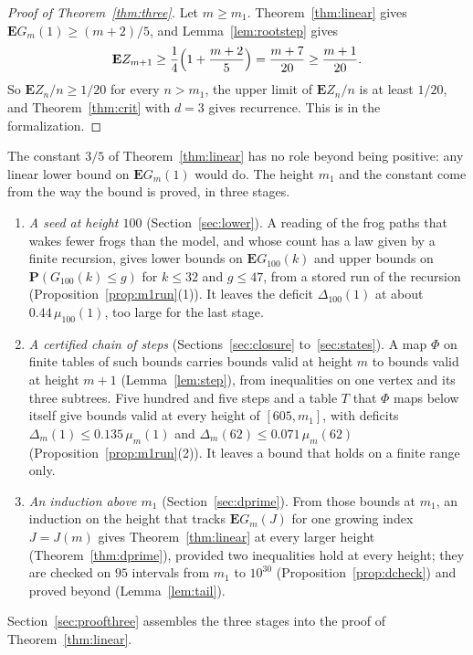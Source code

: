 \documentclass[11pt]{amsart}
\theoremstyle{definition}
\numberwithin{equation}{section}
\newcommand{\computed}[1]{\ignorespaces}
\newcommand{\E}{\mathbf{E}}
\renewcommand{\P}{\mathbf{P}}
\begin{document}
\begin{proof}[Proof of Theorem~\ref{thm:three}]
Let $m\ge m_1$. Theorem~\ref{thm:linear} gives $\E G_m(1)\ge(m+2)/5$, and Lemma~\ref{lem:rootstep} gives
\[
\E Z_{m+1}\ge\frac14\Bigl(1+\frac{m+2}5\Bigr)=\frac{m+7}{20}\ge\frac{m+1}{20}.
\]
So $\E Z_n/n\ge1/20$ for every $n>m_1$, the upper limit of $\E Z_n/n$ is at least $1/20$, and Theorem~\ref{thm:crit} with $d=3$ gives recurrence. This is  in the formalization.\computed{code/formal-proof/main_axioms.lean, .github/workflows/ci.yml}
\end{proof}

The constant $3/5$ of Theorem~\ref{thm:linear} has no role beyond being positive: any linear lower bound on $\E G_m(1)$ would do. The height $m_1$ and the constant come from the way the bound is proved, in three stages.
\begin{enumerate}
\item \emph{A seed at height $100$} (Section~\ref{sec:lower}). A reading of the frog paths that wakes fewer frogs than the model, and whose count has a law given by a finite recursion, gives lower bounds on $\E G_{100}(k)$ and upper bounds on $\P(G_{100}(k)\le g)$ for $k\le32$ and $g\le47$, from a stored run of the recursion (Proposition~\ref{prop:m1run}(1)). It leaves the deficit $\Delta_{100}(1)$ at about $0.44\,\mu_{100}(1)$, too large for the last stage.
\item \emph{A certified chain of steps} (Sections~\ref{sec:closure} to~\ref{sec:states}). A map $\Phi$ on finite tables of such bounds carries bounds valid at height $m$ to bounds valid at height $m+1$ (Lemma~\ref{lem:step}), from inequalities on one vertex and its three subtrees. Five hundred and five steps and a table $T$ that $\Phi$ maps below itself give bounds valid at every height of $[605,m_1]$, with deficits $\Delta_m(1)\le0.135\,\mu_m(1)$ and $\Delta_m(62)\le0.071\,\mu_m(62)$ (Proposition~\ref{prop:m1run}(2)). It leaves a bound that holds on a finite range only.
\item \emph{An induction above $m_1$} (Section~\ref{sec:dprime}). From those bounds at $m_1$, an induction on the height that tracks $\E G_m(J)$ for one growing index $J=J(m)$ gives Theorem~\ref{thm:linear} at every larger height (Theorem~\ref{thm:dprime}), provided two inequalities hold at every height; they are checked on $95$ intervals from $m_1$ to $10^{30}$ (Proposition~\ref{prop:dcheck}) and proved beyond (Lemma~\ref{lem:tail}).
\end{enumerate}
Section~\ref{sec:proofthree} assembles the three stages into the proof of Theorem~\ref{thm:linear}.
\end{document}
